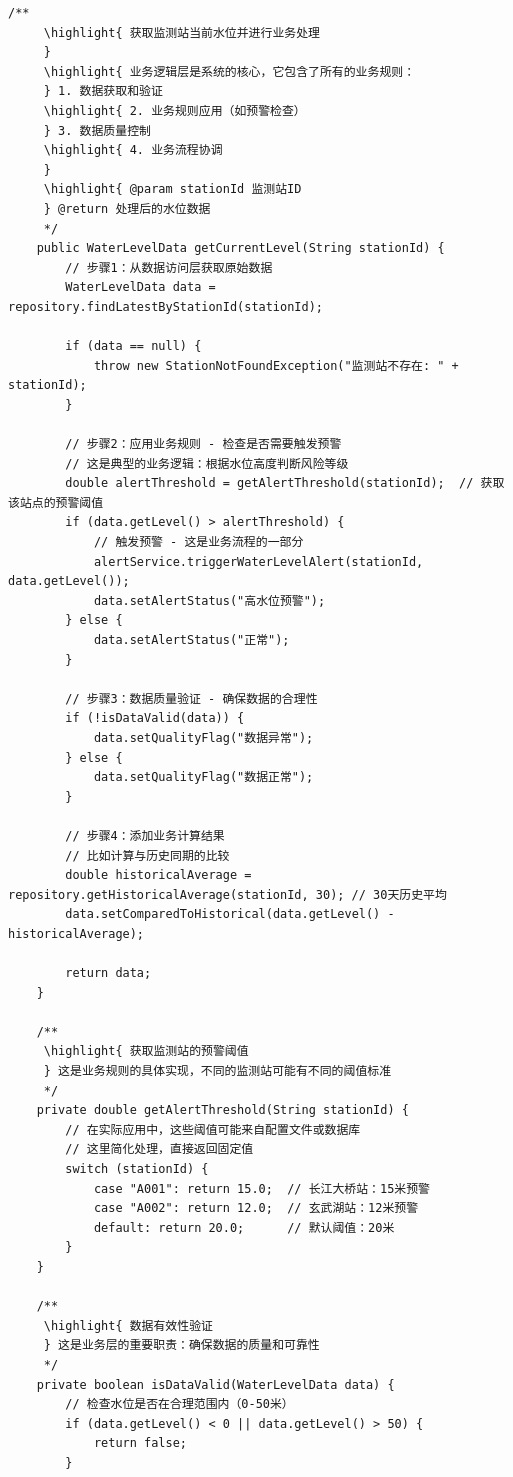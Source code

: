 \begin{lstlisting}[style=java]
    /**
     \highlight{ 获取监测站当前水位并进行业务处理
     } 
     \highlight{ 业务逻辑层是系统的核心，它包含了所有的业务规则：
     } 1. 数据获取和验证
     \highlight{ 2. 业务规则应用（如预警检查）
     } 3. 数据质量控制
     \highlight{ 4. 业务流程协调
     } 
     \highlight{ @param stationId 监测站ID
     } @return 处理后的水位数据
     */
    public WaterLevelData getCurrentLevel(String stationId) {
        // 步骤1：从数据访问层获取原始数据
        WaterLevelData data = repository.findLatestByStationId(stationId);
        
        if (data == null) {
            throw new StationNotFoundException("监测站不存在: " + stationId);
        }
        
        // 步骤2：应用业务规则 - 检查是否需要触发预警
        // 这是典型的业务逻辑：根据水位高度判断风险等级
        double alertThreshold = getAlertThreshold(stationId);  // 获取该站点的预警阈值
        if (data.getLevel() > alertThreshold) {
            // 触发预警 - 这是业务流程的一部分
            alertService.triggerWaterLevelAlert(stationId, data.getLevel());
            data.setAlertStatus("高水位预警");
        } else {
            data.setAlertStatus("正常");
        }
        
        // 步骤3：数据质量验证 - 确保数据的合理性
        if (!isDataValid(data)) {
            data.setQualityFlag("数据异常");
        } else {
            data.setQualityFlag("数据正常");
        }
        
        // 步骤4：添加业务计算结果
        // 比如计算与历史同期的比较
        double historicalAverage = repository.getHistoricalAverage(stationId, 30); // 30天历史平均
        data.setComparedToHistorical(data.getLevel() - historicalAverage);
        
        return data;
    }
    
    /**
     \highlight{ 获取监测站的预警阈值
     } 这是业务规则的具体实现，不同的监测站可能有不同的阈值标准
     */
    private double getAlertThreshold(String stationId) {
        // 在实际应用中，这些阈值可能来自配置文件或数据库
        // 这里简化处理，直接返回固定值
        switch (stationId) {
            case "A001": return 15.0;  // 长江大桥站：15米预警
            case "A002": return 12.0;  // 玄武湖站：12米预警
            default: return 20.0;      // 默认阈值：20米
        }
    }
    
    /**
     \highlight{ 数据有效性验证
     } 这是业务层的重要职责：确保数据的质量和可靠性
     */
    private boolean isDataValid(WaterLevelData data) {
        // 检查水位是否在合理范围内（0-50米）
        if (data.getLevel() < 0 || data.getLevel() > 50) {
            return false;
        }
        

\end{lstlisting}
